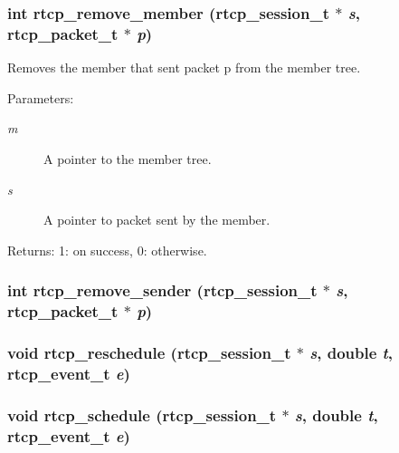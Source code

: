 \subsubsection{\setlength{\rightskip}{0pt plus 5cm}int rtcp\_\-remove\_\-member ({\bf rtcp\_\-session\_\-t} $\ast$ {\em s}, {\bf rtcp\_\-packet\_\-t} $\ast$ {\em p})\hspace{0.3cm}{\tt  [static]}}\label{rtcp_8h_a7}


Removes the member that sent packet p from the member tree. \begin{Desc}
\item[Parameters:]
\begin{description}
\item[{\em m}]A pointer to the member tree. \item[{\em s}]A pointer to packet sent by the member. \end{description}
\end{Desc}
\begin{Desc}
\item[Returns:]1: on success, 0: otherwise. \end{Desc}
\subsubsection{\setlength{\rightskip}{0pt plus 5cm}int rtcp\_\-remove\_\-sender ({\bf rtcp\_\-session\_\-t} $\ast$ {\em s}, {\bf rtcp\_\-packet\_\-t} $\ast$ {\em p})\hspace{0.3cm}{\tt  [static]}}\label{rtcp_8h_a9}


\subsubsection{\setlength{\rightskip}{0pt plus 5cm}void rtcp\_\-reschedule ({\bf rtcp\_\-session\_\-t} $\ast$ {\em s}, double {\em t}, {\bf rtcp\_\-event\_\-t} {\em e})\hspace{0.3cm}{\tt  [static]}}\label{rtcp_8h_a20}


\subsubsection{\setlength{\rightskip}{0pt plus 5cm}void rtcp\_\-schedule ({\bf rtcp\_\-session\_\-t} $\ast$ {\em s}, double {\em t}, {\bf rtcp\_\-event\_\-t} {\em e})\hspace{0.3cm}{\tt  [static]}}\label{rtcp_8h_a19}


